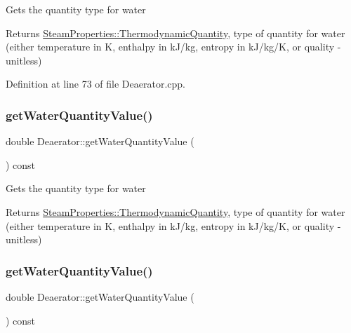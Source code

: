 Gets the quantity type for water \begin{DoxyReturn}{Returns}
\hyperlink{class_steam_properties_ae0294bedf7d178c2d8fb6aed0f62fbff}{Steam\+Properties\+::\+Thermodynamic\+Quantity}, type of quantity for water (either temperature in K, enthalpy in k\+J/kg, entropy in k\+J/kg/K, or quality -\/ unitless) 
\end{DoxyReturn}


Definition at line 73 of file Deaerator.\+cpp.

\mbox{\label{class_deaerator_a9362430fb04802b6f14c9bf09d62a466}} 
\subsubsection{\texorpdfstring{get\+Water\+Quantity\+Value()}{getWaterQuantityValue()}\hspace{0.1cm}{\footnotesize\ttfamily [2/3]}}
{\footnotesize\ttfamily double Deaerator\+::get\+Water\+Quantity\+Value (\begin{DoxyParamCaption}{ }\end{DoxyParamCaption}) const}

Gets the quantity type for water \begin{DoxyReturn}{Returns}
\hyperlink{class_steam_properties_ae0294bedf7d178c2d8fb6aed0f62fbff}{Steam\+Properties\+::\+Thermodynamic\+Quantity}, type of quantity for water (either temperature in K, enthalpy in k\+J/kg, entropy in k\+J/kg/K, or quality -\/ unitless) 
\end{DoxyReturn}
\mbox{\label{class_deaerator_a9362430fb04802b6f14c9bf09d62a466}} 
\subsubsection{\texorpdfstring{get\+Water\+Quantity\+Value()}{getWaterQuantityValue()}\hspace{0.1cm}{\footnotesize\ttfamily [3/3]}}
{\footnotesize\ttfamily double Deaerator\+::get\+Water\+Quantity\+Value (\begin{DoxyParamCaption}{ }\end{DoxyParamCaption}) const}

